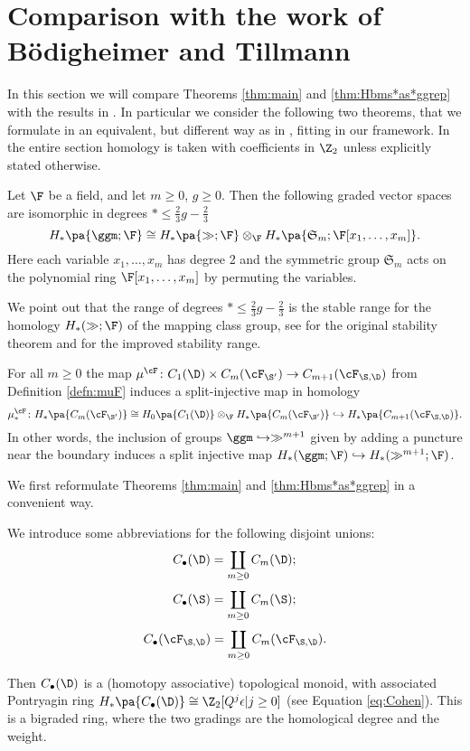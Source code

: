 \section{Comparison with the work of B\"{o}digheimer and Tillmann}
\label{sec:comparison}
In this section we will compare Theorems \ref{thm:main} and \ref{thm:Hbms*as*ggrep}
with the results in \cite{BoT}. In particular we consider the following two theorems, that
we formulate in an equivalent, but different way as in \cite{BoT}, fitting in our
framework. In the entire section homology is taken with coefficients in $\Z_2$ unless explicitly
stated otherwise.
\begin{thm}
\label{thm:BoTone}
Let $\F$ be a field, and let $m\geq 0$, $g\geq 0$. Then the following graded vector spaces are isomorphic in degrees $*\leq \frac 23 g-\frac 23$
\[
 H_*\pa{\ggm;\F}\cong H_*\pa{\gg;\F}\otimes_{\F} H_*\pa{\mathfrak{S}_m;\F[x_1,\dots,x_m]}.
\]
Here each variable $x_1,\dots,x_m$ has degree 2 and the symmetric group $\mathfrak{S}_m$ acts on the polynomial
ring $\F[x_1,\dots,x_m]$ by permuting the variables.
\end{thm}
We point out that the range of degrees $*\leq \frac 23 g-\frac 23$ is the stable range for the homology $H_*(\gg;\F)$
of the mapping class group, see \cite{Harer} for the original stability theorem and \cite{Boldsen, ORW:resolutions_homstab} for the improved
stability range.
\begin{thm}
\label{thm:BoTtwo}
For all $m\geq 0$ the map $\mu^{\cF}\colon C_1(\D)\times C_m(\cF_{\S'})\to C_{m+1}(\cF_{\S,\D})$ from Definition \ref{defn:muF}
induces a split-injective map in homology
\[
 \mu^{\cF}_*\colon H_*\pa{C_m(\cF_{\S'})}\cong H_0\pa{C_1(\D)}\otimes_{\F} H_*\pa{C_m(\cF_{\S'})}\hookrightarrow H_*\pa{C_{m+1}(\cF_{\S,\D})}.
\]
In other words, the inclusion of groups $\ggm\hookrightarrow\gg^{m+1}$ given by adding a puncture near the boundary induces a split
injective map $H_*(\ggm;\F)\hookrightarrow H_*(\gg^{m+1};\F)$.
\end{thm}

We first reformulate Theorems \ref{thm:main} and \ref{thm:Hbms*as*ggrep} in a convenient way.
\begin{defn}
 \label{defn:Cbullet}
 We introduce some abbreviations for the following disjoint unions:
 \[
 C_{\bullet}(\D)=\coprod_{m\geq 0}C_m(\D);
 \]
 \[
 C_{\bullet}(\S)=\coprod_{m\geq 0}C_m(\S); 
 \]
 \[
 C_{\bullet}(\cF_{\S,\D})=\coprod_{m\geq 0}C_m(\cF_{\S,\D}).
 \]
\end{defn}
Then $C_{\bullet}(\D)$ is a (homotopy associative) topological monoid, with associated
Pontryagin ring $H_*\pa{C_{\bullet}(\D)}\cong\Z_2[Q^j\epsilon|j\geq 0]$ (see Equation \ref{eq:Cohen}).
This is a bigraded ring, where the two gradings are the homological degree and the weight.

